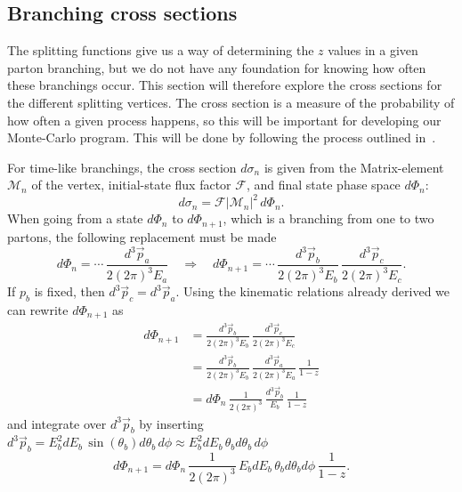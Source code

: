 \documentclass[main.tex]{subfiles}
\begin{document}
\subsection{Branching cross sections}
The splitting functions give us a way of determining the \(z\) values in a given parton branching, but we do not have any foundation for knowing how often these branchings occur. This section will therefore explore the cross sections for the different splitting vertices. The cross section is a measure of the probability of how often a given process happens, so this will be important for developing our Monte-Carlo program. This will be done by following the process outlined in~\cite[p.164]{ellis_stirling_webber_1996}.

For time-like branchings, the cross section \(d\sigma_n\) is given from the Matrix-element \(\mathcal{M}_n\) of the vertex, initial-state flux factor \(\mathcal{F}\), and final state phase space \(d\Phi_n\):
\begin{equation}\label{eqn: cross_section_thing}
    d\sigma_n = \mathcal{F} |\mathcal{M}_n|^2 \, d\Phi_n.
\end{equation}
When going from a state \(d\Phi_n\) to \(d\Phi_{n+1}\), which is a branching from one to two partons, the following replacement must be made 
\begin{equation}
    d\Phi_n = \cdots \, \frac{d^3 \vec p_a}{2(2\pi)^3 E_a} \quad \Rightarrow \quad d\Phi_{n+1} = \cdots \, \frac{d^3 \vec p_b}{2 (2\pi)^3 E_b} \, \frac{d^3 \vec p_c}{2(2\pi)^3 E_c}.
\end{equation}
If \(p_b\) is fixed, then \(d^3 \vec p_c = d^3 \vec p_a\). Using the kinematic relations already derived we can rewrite \(d\Phi_{n+1}\) as
 \begin{align}
    d\Phi_{n+1} &= \frac{d^3 \vec p_b}{2(2\pi)^3 E_b}\, \frac{d^3 \vec p_c}{2(2\pi)^3 E_c} \nonumber\\
    &=\frac{d^3 \vec p_b}{2(2\pi)^3 E_b} \,\frac{d^3 \vec p_a}{2(2\pi)^3 E_a}\, \frac{1}{1-z} \nonumber\\
    &= d\Phi_n\, \frac{1}{2(2\pi)^3}\, \frac{d^3 \vec p_b}{E_b} \,\frac{1}{1-z}
 \end{align}
and integrate over \(d^3\vec p _b\) by inserting \(d^3\vec p_b = E_b^2 dE_b\, \sin(\theta_b) d\theta_b \, d\phi \approx E_b^2 dE_b\, \theta_b d\theta_b\, d\phi\)
\begin{equation}
    d\Phi_{n+1} = d\Phi_n \,\frac{1}{2(2\pi)^3} \,E_b dE_b \, \theta_b d\theta_b d\phi \,  \frac{1}{1-z}.
\end{equation}
\end{document}
